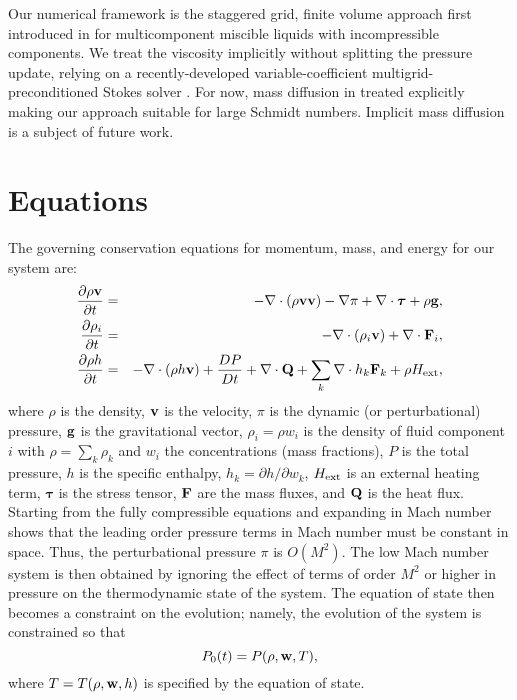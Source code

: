 \documentclass[final]{siamltex}
\def\Fb {{\bf F}}
\def\gb {{\bf g}}
\def\Qb {{\bf Q}}
\def\vb {{\bf v}}
\def\wb {{\bf w}}
\def\taub   {\boldsymbol{\tau}}
\def\Hext {H_{\rm ext}}
\begin{document}
Our numerical framework is the staggered grid, finite volume approach first
introduced in \cite{LowMachExplicit,LowMachImplicit,LowMachMulti} for
multicomponent miscible liquids with incompressible components.
We treat the viscosity implicitly without splitting the pressure
update, relying on a recently-developed variable-coefficient multigrid-preconditioned
Stokes solver \cite{StokesPreconditioners}.
For now, mass diffusion in treated explicitly making our
approach suitable for large Schmidt numbers.  Implicit mass diffusion is a subject
of future work.

\section{Equations}
The governing conservation equations for momentum, mass, and energy for our system are:
\begin{eqnarray}
\frac{\partial\rho\vb}{\partial t} &=& - \nabla\cdot(\rho\vb\vb) - \nabla\pi + \nabla\cdot\taub + \rho\gb,\label{eq:momentum}\\
\frac{\partial\rho_i}{\partial t} &=& -\nabla\cdot(\rho_i\vb) + \nabla\cdot \Fb_i,\label{eq:mass}\\
\frac{\partial\rho h}{\partial t} &=& -\nabla\cdot(\rho h\vb) + \frac{DP}{Dt} + \nabla\cdot\Qb + \sum_k \nabla\cdot h_k \Fb_k + \rho\Hext,\label{eq:enthalpy}
\end{eqnarray}
where $\rho$ is the density, $\vb$ is the velocity, $\pi$ is the dynamic 
(or perturbational) pressure, $\gb$ is the gravitational vector, $\rho_i=\rho w_i$ is
the density of fluid component $i$ with $\rho = \sum_k\rho_k$ and $w_i$ the 
concentrations (mass fractions), $P$ is the total
pressure, $h$ is the specific enthalpy, $h_k = \partial h/\partial w_k$,
$\Hext$ is an external heating term, $\taub$ is the stress tensor,
$\Fb$ are the mass fluxes, and $\Qb$ is the heat flux.
Starting from the fully compressible equations and expanding in Mach number shows 
that the leading order pressure terms in Mach number must be constant in space. 
Thus, the perturbational pressure $\pi$ is $O(M^2)$.
The low Mach number system is then obtained by ignoring the effect of terms of 
order $M^2$ or higher in pressure  on the thermodynamic state of the system.
The equation of state then becomes a constraint on the evolution; namely,
the evolution of the system is constrained so that
\begin{equation}
P_0(t) = P(\rho,\wb,T),\label{eq:EOS}
\end{equation}
where $T=T(\rho,\wb,h)$ is specified by the equation of state.\\
\end{document}
